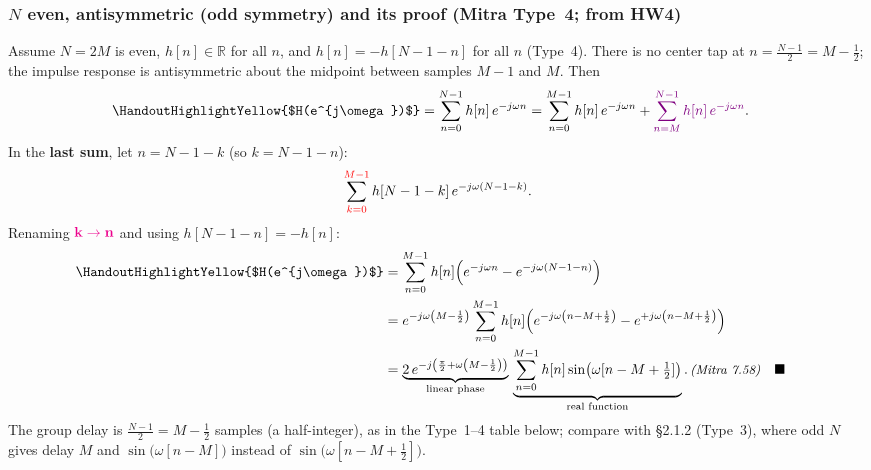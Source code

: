 \documentclass[handout_subfiles_root.tex]{subfiles}
\begin{document}
\subsubsection{$N$ even, antisymmetric (odd symmetry) and its proof (Mitra Type~4; from HW4)}
\noindent Assume $N = 2M$ is even, $h[n]\in\mathbb{R}$ for all $n$, and $h[n] = -h[N-1-n]$ for all $n$ (Type~4). There is no center tap at $n=\tfrac{N-1}{2}=M-\tfrac{1}{2}$; the impulse response is antisymmetric about the midpoint between samples $M-1$ and $M$. Then
\begin{align*}
\HandoutHighlightYellow{$H(e^{j\omega})$}
&= \sum_{n=0}^{N-1} h[n]\,e^{-j\omega n}
= \sum_{n=0}^{M-1} h[n]\,e^{-j\omega n}
+ {\color{ee483lastsum}\sum_{n=M}^{N-1} h[n]\,e^{-j\omega n}}.
\end{align*}
In the \textcolor{ee483lastsum}{\textbf{last sum}}, let $n = N-1-k$ (so $k = N-1-n$):
\begin{equation*}
\sum_{\textcolor{red}{k=0}}^{\textcolor{red}{M-1}} h[N-1-k]\,e^{-j\omega(N-1-k)}.
\end{equation*}
%
Renaming $\HandoutPinkEmph{k\to n}$ and using $h[N-1-n]=-h[n]$:
\begin{align*}
\HandoutHighlightYellow{$H(e^{j\omega})$}
&= \sum_{n=0}^{M-1} h[n]\Bigl(e^{-j\omega n}-e^{-j\omega(N-1-n)}\Bigr) \\
&= e^{-j\omega\left(M-\frac{1}{2}\right)}
\sum_{n=0}^{M-1} h[n]\Bigl(e^{-j\omega\left(n-M+\frac{1}{2}\right)}
-e^{+j\omega\left(n-M+\frac{1}{2}\right)}\Bigr) \\
&= \underbrace{2\,e^{-j\left(\frac{\pi}{2}+\omega\left(M-\frac{1}{2}\right)\right)}}_{\HandoutUnderbraceLabel{\text{linear phase}}}\,
\underbrace{\sum_{n=0}^{M-1} h[n]\sin\!\big(\omega[n-M+\tfrac{1}{2}]\big)}_{\HandoutUnderbraceLabel{\text{real function}}}. \MitraEq{7.58} && \HandoutQEDalign
\end{align*}
\noindent The group delay is $\tfrac{N-1}{2}=M-\tfrac{1}{2}$ samples (a half-integer), as in the Type~1--4 table below; compare with §2.1.2 (Type~3), where odd $N$ gives delay $M$ and $\sin\big(\omega[n-M]\big)$ instead of $\sin\big(\omega[n-M+\tfrac{1}{2}]\big)$.
\end{document}
